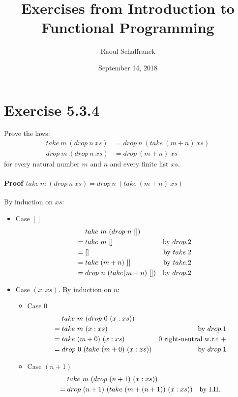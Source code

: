 \documentclass{article}[10pt]
\title{Exercises from Introduction to Functional Programming}
\author{Raoul Schaffranek}
\date{September 14, 2018}
\begin{document}
  \maketitle
  \section{Exercise 5.3.4}
    Prove the laws:
    \begin{align*}
      take\ m\ (drop\ n\ xs) &= drop\ n\ (take\ (m + n)\ xs)\\
      drop\ m\ (drop\ n\ xs) &= drop\ (m + n)\ xs
    \end{align*}
    for every natural number $m$ and $n$ and every finite list $xs$.
    \paragraph{Proof $take\ m\ (drop\ n\ xs) = drop\ n\ (take\ (m + n)\ xs)$}
    By induction on $xs$:
    \begin{itemize}
      \item Case $[]$
        \begin{align*}
          &\mathrel{\hphantom{=}} take\ m\ (drop\ n\ [])\\
          &= take\ m\ []               &\text{by } drop.2\\
          &= []                        &\text{by } take.2\\
          &= take\ (m+n)\ []           &\text{by } take.2\\
          &= drop\ n\ (take (m+n)\ []) &\text{by } drop.2
        \end{align*}
      \item Case $(x:xs)$. By induction on $n$:
        \begin{itemize}
          \item Case $0$
          \begin{align*}
            &\mathrel{\hphantom{=}} take\ m\ (drop\ 0\ (x:xs))\\
            &= take\ m\ (x:xs)                &\text{by }drop.1\\
            &= take\ (m+0)\ (x:xs)            &0 \text{ right-neutral w.r.t }+\\
            &= drop\ 0\ (take\ (m+0)\ (x:xs)) &\text{by }drop.1
          \end{align*}
          \item Case $(n+1)$
          \begin{align*}
            &\mathrel{\hphantom{=}} take\ m\ (drop\ (n+1)\ (x:xs))\\
            &= drop\ (n+1)\ (take\ (m+(n+1))\ (x:xs))          &\text{by I.H.}
          \end{align*}
        \end{itemize}
    \end{itemize}
\end{document}
